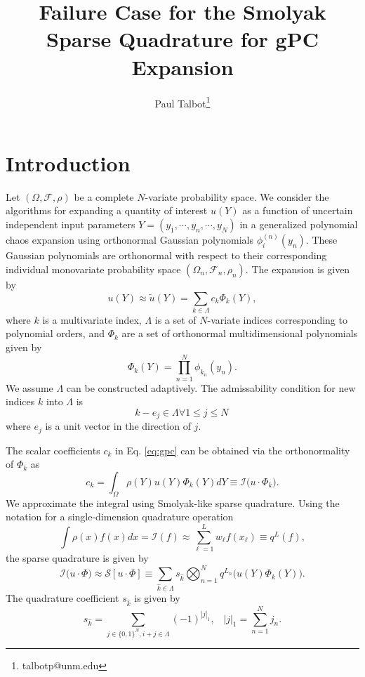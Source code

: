 \documentclass[11pt]{article}
\begin{document}
\title{Failure Case for the Smolyak Sparse Quadrature for gPC Expansion}

\author[]{Paul Talbot\thanks{talbotp@unm.edu}}
\date{}
\renewcommand\Authands{ and }
\maketitle
\section{Introduction}
Let $(\Omega,\mathcal{F},\rho)$ be a complete $N$-variate probability space.
We consider the algorithms for expanding a quantity of interest $u(Y)$ as a function of uncertain independent
input parameters $Y = (y_1,\cdots,y_n,\cdots,y_N)$ in a generalized polynomial chaos expansion using
orthonormal Gaussian polynomials $\phi_i^{(n)}(y_n)$.  These Gaussian polynomials are orthonormal with respect
to their corresponding individual monovariate probability space $(\Omega_n,\mathcal{F}_n,\rho_n)$.  The
expansion is given by
\begin{equation}\label{eq:gpc}
  u(Y)\approx \tilde u(Y) = \sum_{k\in\Lambda} c_k \Phi_k(Y),
\end{equation}
where $k$ is a multivariate index, $\Lambda$ is a set of $N$-variate indices corresponding to polynomial
orders, and $\Phi_k$ are a set of orthonormal multidimensional polynomials given by
\begin{equation}
  \Phi_k(Y) = \prod_{n=1}^N \phi_{k_n}(y_n).
\end{equation}
We assume $\Lambda$ can be constructed adaptively.  The admissability condition for new indices $k$ into
$\Lambda$ is
\begin{equation}
  k-e_j \in \Lambda \forall 1\leq j\leq N\,
\end{equation}
where $e_j$ is a unit vector in the direction of $j$.

The scalar coefficients $c_k$ in Eq. \ref{eq:gpc} can be obtained via the orthonormality of $\Phi_k$ as
\begin{equation}\label{eq:coeffs}
  c_k = \int_\Omega \rho(Y) u(Y) \Phi_k(Y) dY \equiv \mathcal{I}\big(u\cdot\Phi_k\big).
\end{equation}
We approximate the integral using Smolyak-like sparse quadrature. Using the notation for a single-dimension
quadrature operation
\begin{equation}
  \int \rho(x)f(x)dx = \mathcal{I}(f) \approx \sum_{\ell=1}^L w_\ell f(x_\ell) \equiv q^{L}(f),
\end{equation}
the sparse quadrature is given by
\begin{equation}
  \mathcal{I}\big(u\cdot\Phi\big)\approx\mathcal{S}[u\cdot\Phi]\equiv \sum_{\hat k\in\Lambda} s_{\hat k} \bigotimes_{n=1}^N
  q^{L_n}\big(u(Y)\Phi_k(Y)\big).
\end{equation}
The quadrature coefficient $s_{\hat k}$ is given by
\begin{equation}
  s_{\hat k} = \sum_{j\in\{0,1\}^N,i+j\in\Lambda} (-1)^{|j|_1}, \hspace{10pt} |j|_1 = \sum_{n=1}^N j_n. 
\end{equation}
\end{document}
